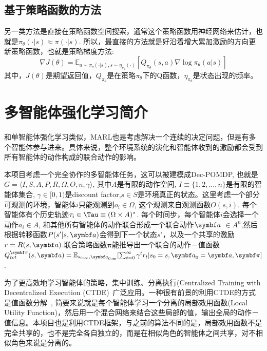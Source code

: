 \subsection{基于策略函数的方法}
另一类方法是直接在策略函数空间搜索，通常这个策略函数用神经网络来估计，也就是$\pi_\theta(\cdot|s)\approx \pi(\cdot|s)$. 所以，最直接的方法就是好沿着增大累加激励的方向更新策略函数，也就是策略梯度方法:
\begin{equation}
    \nabla J(\theta) = \mathbb{E}_{a\sim \pi_{\theta}(\cdot|s),s\sim\eta_{\pi_\theta}(\cdot)}\left[Q_{\pi_\theta}(s,a)\nabla \log \pi_\theta (a|s) \right]
\end{equation}
其中，$J(\theta)$是期望返回值，$Q_{\pi_\theta}$是在策略$\pi_\theta$下的Q函数，$\eta_{\pi_\theta}$是状态出现的频率。

\section{多智能体强化学习简介}
和单智能体强化学习类似，MARL也是考虑解决一个连续的决定问题，但是有多个智能体参与进来。具体来说，整个环境系统的演化和智能体收到的激励都会受到所有智能体的动作构成的联合动作的影响。

本项目考虑一个完全协作的多智能体任务，这可以被建模成Dec-POMDP, 也就是~\cite{oliehoek2016concise}$G=\langle I, S, A, P, R, \Omega, O, n, \gamma\rangle$, 其中$A$是有限的动作空间, $I\equiv\{1,2,...,n\}$是有限的智能体集合, $\gamma\in[0, 1)$是discount factor,$s\in S$是环境真正的状态。这里考虑一个部分可观测的环境，智能体$i$只能观测到$o_i\in \Omega$, 这个观测来自观测函数$O(s, i)$. 每个智能体有个历史轨迹$\tau_i\in \Tau\equiv(\Omega\times A)^*$. 每个时间步，每个智能体$i$会选择一个动作$a_i\in A$, 和其他所有智能体的动作联合形成一个联合动作$\va$ $\in A^n$,然后根据转移函数$P(s'|s, \va)$会得到下一个状态$s'$，以及一个共享的激励$r=R(s,\va)$.联合策略函数$\bm{\pi}$能推导出一个联合的动作－值函数$Q_{tot}^{\bm{\pi}}(s,\va)=\mathbb{E}_{s_{0:\infty},\va_{0:\infty}}[\sum_{t=0}^\infty \gamma^{t}r_t|s_0=s,\va_0=\va,\bm{\pi}]$. 

为了更高效地学习智能体的策略，集中训练、分离执行(Centralized Training with Decentralized Execution (CTDE)~\cite{foerster2016learning, foerster2018counterfactual}广泛应用。一种很有前景的利用CTDE的方式是值函数分解~\cite{sunehag2018value, rashid2018qmix, son2019qtran}, 简要来说就是每个智能体学习一个分离的局部效用函数(Local Utility Function)，然后用一个混合网络来结合这些局部的值，输出全局的动作－值信息。本项目也是利用CTDE框架，与之前的算法不同的是，局部效用函数不是完全共享的，也不是完全各自独立的，而是在相似角色的智能体之间共享，对不相似角色来说是分离的。

